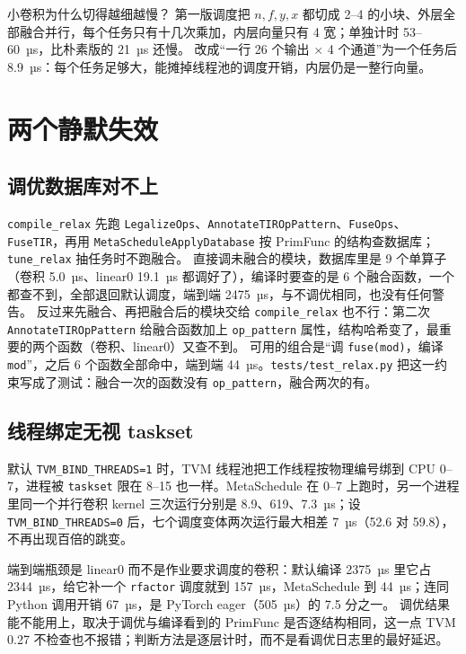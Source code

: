 \documentclass[11pt,a4paper]{ctexart}
\begin{document}
\begin{iqbox}{小卷积为什么切得越细越慢？}
第一版调度把 $n, f, y, x$ 都切成 2--4 的小块、外层全部融合并行，每个任务只有十几次乘加，内层向量只有 4 宽；单独计时 53--60~µs，比朴素版的 21~µs 还慢。
改成“一行 26 个输出 $\times$ 4 个通道”为一个任务后 8.9~µs：每个任务足够大，能摊掉线程池的调度开销，内层仍是一整行向量。
\end{iqbox}

\section{两个静默失效}
\subsection{调优数据库对不上}
\texttt{compile\_relax} 先跑 \texttt{LegalizeOps}、\texttt{AnnotateTIROpPattern}、\texttt{FuseOps}、\texttt{FuseTIR}，再用 \texttt{MetaScheduleApplyDatabase} 按 PrimFunc 的结构查数据库；\texttt{tune\_relax} 抽任务时不跑融合。
直接调未融合的模块，数据库里是 9 个单算子（卷积 5.0~µs、linear0 19.1~µs 都调好了），编译时要查的是 6 个融合函数，一个都查不到，全部退回默认调度，端到端 2475~µs，与不调优相同，也没有任何警告。
反过来先融合、再把融合后的模块交给 \texttt{compile\_relax} 也不行：第二次 \texttt{AnnotateTIROpPattern} 给融合函数加上 \texttt{op\_pattern} 属性，结构哈希变了，最重要的两个函数（卷积、linear0）又查不到。
可用的组合是“调 \texttt{fuse(mod)}，编译 \texttt{mod}”，之后 6 个函数全部命中，端到端 44~µs。\texttt{tests/test\_relax.py} 把这一约束写成了测试：融合一次的函数没有 \texttt{op\_pattern}，融合两次的有。

\subsection{线程绑定无视 taskset}
默认 \texttt{TVM\_BIND\_THREADS=1} 时，TVM 线程池把工作线程按物理编号绑到 CPU 0--7，进程被 \texttt{taskset} 限在 8--15 也一样。MetaSchedule 在 0--7 上跑时，另一个进程里同一个并行卷积 kernel 三次运行分别是 8.9、619、7.3~µs；设 \texttt{TVM\_BIND\_THREADS=0} 后，七个调度变体两次运行最大相差 7~µs（52.6 对 59.8），不再出现百倍的跳变。

\begin{findingbox}[：MLC 作业 1]
端到端瓶颈是 linear0 而不是作业要求调度的卷积：默认编译 2375~µs 里它占 2344~µs，给它补一个 \texttt{rfactor} 调度就到 157~µs，MetaSchedule 到 44~µs；连同 Python 调用开销 67~µs，是 PyTorch eager（505~µs）的 7.5 分之一。
调优结果能不能用上，取决于调优与编译看到的 PrimFunc 是否逐结构相同，这一点 TVM 0.27 不检查也不报错；判断方法是逐层计时，而不是看调优日志里的最好延迟。
\end{findingbox}
\end{document}
